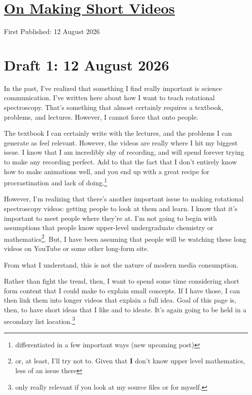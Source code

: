 \documentclass[12pt]{article}
\renewcommand{\,}{\textsuperscript{,}}
\renewcommand{\title}[2]{\section{\href{#1.html}{#2}}}
\newcommand{\published}[1]{First Published: #1}
\newcommand{\draft}[1]{\section{Draft #1}}
\begin{document}
  
\title{making-short-videos}{On Making Short Videos}  
\published{12 August 2026}  
\draft{1: 12 August 2026}

In the past, I've realized that something I find really important is science communication.  
I've written here about how I want to teach rotational spectroscopy.  
That's something that almost certainly requires a textbook, problems, and lectures.  
However, I cannot force that onto people.

The textbook I can certainly write with the lectures, and the problems I can generate as feel relevant.  
However, the videos are really where I hit my biggest issue.  
I know that I am incredibly shy of recording, and will spend forever trying to make any recording perfect.  
Add to that the fact that I don't entirely know how to make animations well, and you end up with a great recipe for procrastination and lack of doing.\footnote{differentiated in a few important ways (new upcoming post)}

However, I'm realizing that there's another important issue to making rotational spectroscopy videos: getting people to look at them and learn.  
I know that it's important to meet people where they're at.  
I'm not going to begin with assumptions that people know upper-level undergraduate chemistry or mathematics\footnote{or, at least, I'll try not to. Given that \textbf{I} don't know upper level mathematics, less of an issue there}.  
But, I have been assuming that people will be watching these long videos on YouTube or some other long-form site.

From what I understand, this is not the nature of modern media consumption.

Rather than fight the trend, then, I want to spend some time considering short form content that I could make to explain small concepts.  
If I have those, I can then link them into longer videos that explain a full idea.  
Goal of this page is, then, to have short ideas that I like and to ideate.  
It's again going to be held in a secondary list location.\footnote{only really relevant if you look at my source files or for myself.}



\end{document}
